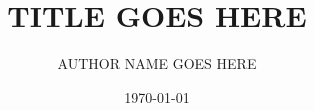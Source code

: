 \documentclass[12pt]{report}
\title{TITLE GOES HERE}
\author{AUTHOR NAME GOES HERE}
\date{\today}
\begin{document}
\maketitle

\begin{landscape}



\end{landscape}


\end{document}
